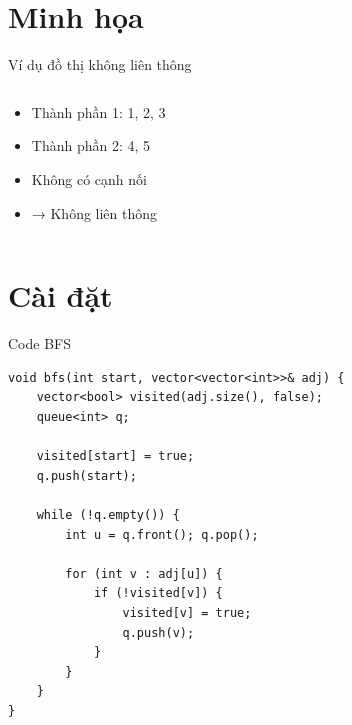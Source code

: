 \documentclass{beamer}
\begin{document}
\section{Minh họa}

\begin{frame}{Ví dụ đồ thị không liên thông}
\begin{columns}


\begin{tcolorbox}
\begin{itemize}
\item \faUsers Thành phần 1: 1, 2, 3
\item \faUsers Thành phần 2: 4, 5
\item \faTimes Không có cạnh nối
\item \faExclamationTriangle → Không liên thông
\end{itemize}
\end{tcolorbox}

\end{columns}
\end{frame}

\section{Cài đặt}

\begin{frame}[fragile]{Code BFS}
\begin{tcolorbox}
\begin{lstlisting}
void bfs(int start, vector<vector<int>>& adj) {
    vector<bool> visited(adj.size(), false);
    queue<int> q;

    visited[start] = true;
    q.push(start);

    while (!q.empty()) {
        int u = q.front(); q.pop();

        for (int v : adj[u]) {
            if (!visited[v]) {
                visited[v] = true;
                q.push(v);
            }
        }
    }
}
\end{lstlisting}
\end{tcolorbox}
\end{frame}
\end{document}
